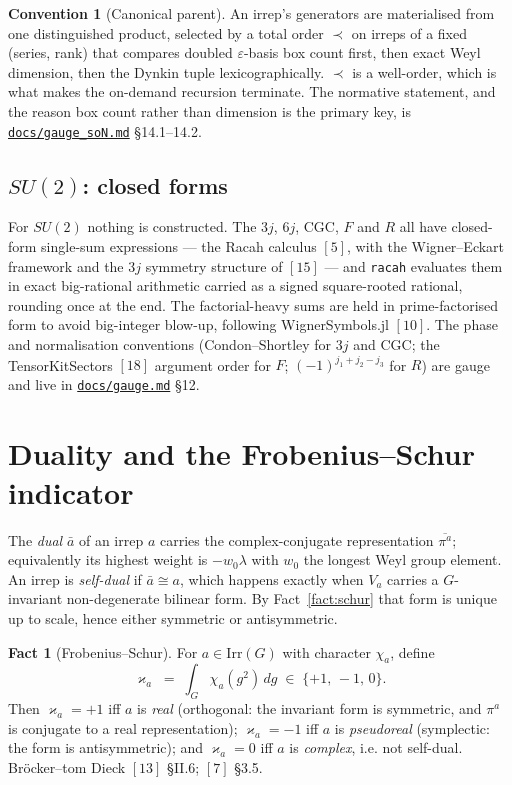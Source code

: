 \documentclass[11pt,a4paper]{article}
\theoremstyle{plain}
\theoremstyle{definition}
\newtheorem{fact}[theorem]{Fact}
\newtheorem{convention}[theorem]{Convention}
\newcommand{\Irr}{\mathrm{Irr}}
\newcommand{\dual}[1]{\bar{#1}}
\newcommand{\code}[1]{\texttt{#1}}
\newcommand{\gaugemd}{\href{https://github.com/Ryo-wtnb11/fusion-symbols/blob/main/docs/gauge.md}{\code{docs/gauge.md}}}
\newcommand{\gaugeson}{\href{https://github.com/Ryo-wtnb11/fusion-symbols/blob/main/docs/gauge_soN.md}{\code{docs/gauge\_soN.md}}}
\begin{document}
\begin{convention}[Canonical parent]
An irrep's generators are materialised from one distinguished product, selected
by a total order $\prec$ on irreps of a fixed (series, rank) that compares
doubled $\varepsilon$-basis box count first, then exact Weyl dimension, then
the Dynkin tuple lexicographically. $\prec$ is a well-order, which is what makes
the on-demand recursion terminate. The normative statement, and the reason box
count rather than dimension is the primary key, is \gaugeson{} \S14.1--14.2.
\end{convention}

\subsection{$SU(2)$: closed forms}
\label{sec:su2}

For $SU(2)$ nothing is constructed. The $3j$, $6j$, CGC, $F$ and $R$ all have
closed-form single-sum expressions --- the Racah calculus $[5]$, with the
Wigner--Eckart framework and the $3j$ symmetry structure of $[15]$ --- and
\code{racah} evaluates them in exact big-rational arithmetic carried as a
signed square-rooted rational, rounding once at the end. The factorial-heavy
sums are held in prime-factorised form to avoid big-integer blow-up, following
WignerSymbols.jl $[10]$. The phase and normalisation conventions
(Condon--Shortley for $3j$ and CGC; the TensorKitSectors $[18]$ argument order
for $F$; $(-1)^{j_1+j_2-j_3}$ for $R$) are gauge and live in \gaugemd{} \S12.

\section{Duality and the Frobenius--Schur indicator}
\label{sec:fs}

The \emph{dual} $\dual a$ of an irrep $a$ carries the complex-conjugate
representation $\overline{\pi^a}$; equivalently its highest weight is
$-w_0\lambda$ with $w_0$ the longest Weyl group element. An irrep is
\emph{self-dual} if $\dual a\cong a$, which happens exactly when $V_a$ carries a
$G$-invariant non-degenerate bilinear form. By Fact~\ref{fact:schur} that form
is unique up to scale, hence either symmetric or antisymmetric.

\begin{fact}[Frobenius--Schur]\label{fact:fs}
For $a\in\Irr(G)$ with character $\chi_a$, define
\begin{equation}\label{eq:fs}
  \varkappa_a \;=\; \int_G \chi_a(g^2)\, dg
  \;\in\; \{+1,\,-1,\,0\}.
\end{equation}
Then $\varkappa_a=+1$ iff $a$ is \emph{real} (orthogonal: the invariant form is
symmetric, and $\pi^a$ is conjugate to a real representation);
$\varkappa_a=-1$ iff $a$ is \emph{pseudoreal} (symplectic: the form is
antisymmetric); and $\varkappa_a=0$ iff $a$ is \emph{complex}, i.e. not
self-dual. Br\"ocker--tom Dieck $[13]$ \S II.6; $[7]$ \S3.5.
\end{fact}
\end{document}
